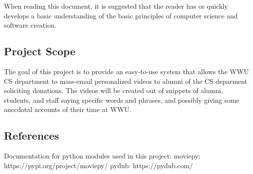 When reading this document, it is suggested that the reader has or quickly develops a basic understanding of the basic principles 
 of computer science and software creation.

\subsection{Project Scope}
The goal of this project is to provide an easy-to-use system that allows the WWU CS department to mass-email personalized videos
 to alumni of the CS deparment soliciting donations. The videos will be created out of snippets of alumni, students, and staff
 saying specific words and phrases, and possibly giving some anecdotal accounts of their time at WWU.

\subsection{References}

Documentation for python modules used in this project:
moviepy: https://pypi.org/project/moviepy/
pydub: https://pydub.com/
